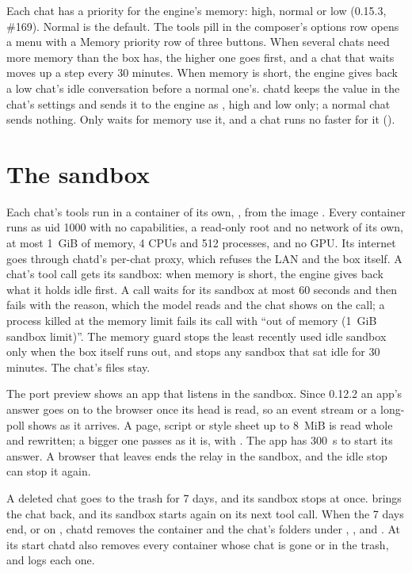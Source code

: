 Each chat has a priority for the engine's memory: high, normal or low (0.15.3, \#169). Normal is the default. The tools pill in the composer's options row opens a menu with a Memory priority row of three buttons. When several chats need more memory than the box has, the higher one goes first, and a chat that waits moves up a step every 30 minutes. When memory is short, the engine gives back a low chat's idle conversation before a normal one's. chatd keeps the value in the chat's settings and sends it to the engine as , high and low only; a normal chat sends nothing. Only waits for memory use it, and a chat runs no faster for it ().

\section{The sandbox}\label{sec:chat-sandbox}

Each chat's tools run in a container of its own, , from the image . Every container runs as uid 1000 with no capabilities, a read-only root and no network of its own, at most 1~GiB of memory, 4 CPUs and 512 processes, and no GPU. Its internet goes through chatd's per-chat proxy, which refuses the LAN and the box itself. A chat's tool call gets its sandbox: when memory is short, the engine gives back what it holds idle first. A call waits for its sandbox at most 60 seconds and then fails with the reason, which the model reads and the chat shows on the call; a process killed at the memory limit fails its call with ``out of memory (1~GiB sandbox limit)''. The memory guard stops the least recently used idle sandbox only when the box itself runs out, and stops any sandbox that sat idle for 30 minutes. The chat's files stay.

The port preview shows an app that listens in the sandbox. Since 0.12.2 an app's answer goes on to the browser once its head is read, so an event stream or a long-poll shows as it arrives. A page, script or style sheet up to 8~MiB is read whole and rewritten; a bigger one passes as it is, with . The app has 300~s to start its answer. A browser that leaves ends the relay in the sandbox, and the idle stop can stop it again.

A deleted chat goes to the trash for 7 days, and its sandbox stops at once.  brings the chat back, and its sandbox starts again on its next tool call. When the 7 days end, or on , chatd removes the container and the chat's folders under , ,  and . At its start chatd also removes every container whose chat is gone or in the trash, and logs each one.


